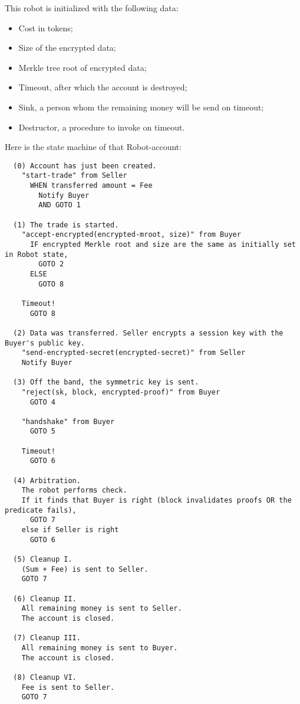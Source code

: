 This robot is initialized with the following data:
\begin{itemize}
  \item Cost in tokens;
  \item Size of the encrypted data;
  \item Merkle tree root of encrypted data;
  \item Timeout, after which the account is destroyed;
  \item Sink, a person whom the remaining money will be send on timeout;
  \item Destructor, a procedure to invoke on timeout.
\end{itemize}

Here is the state machine of that Robot-account:

\begin{verbatim}
  (0) Account has just been created.
    "start-trade" from Seller
      WHEN transferred amount = Fee
        Notify Buyer
        AND GOTO 1

  (1) The trade is started.
    "accept-encrypted(encrypted-mroot, size)" from Buyer
      IF encrypted Merkle root and size are the same as initially set in Robot state,
        GOTO 2
      ELSE
        GOTO 8

    Timeout!
      GOTO 8

  (2) Data was transferred. Seller encrypts a session key with the Buyer's public key.
    "send-encrypted-secret(encrypted-secret)" from Seller
    Notify Buyer

  (3) Off the band, the symmetric key is sent.
    "reject(sk, block, encrypted-proof)" from Buyer
      GOTO 4

    "handshake" from Buyer
      GOTO 5

    Timeout!
      GOTO 6

  (4) Arbitration.
    The robot performs check.
    If it finds that Buyer is right (block invalidates proofs OR the predicate fails),
      GOTO 7
    else if Seller is right
      GOTO 6

  (5) Cleanup I.
    (Sum + Fee) is sent to Seller.
    GOTO 7

  (6) Cleanup II.
    All remaining money is sent to Seller.
    The account is closed.

  (7) Cleanup III.
    All remaining money is sent to Buyer.
    The account is closed.

  (8) Cleanup VI.
    Fee is sent to Seller.
    GOTO 7

\end{verbatim}

